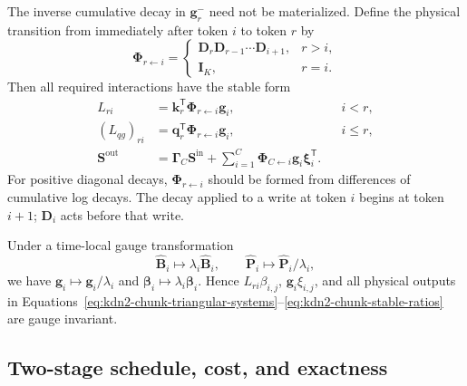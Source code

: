 \documentclass[11pt]{article}
\newcommand{\ve}[1]{\boldsymbol{#1}}
\newcommand{\tr}{\mathsf{T}}
\begin{document}
The inverse cumulative decay in $\ve{g}^{-}_r$ need not be materialized.  Define the physical
transition from immediately after token $i$ to token $r$ by
\begin{equation}
  \ve{\Phi}_{r\leftarrow i}
  =
  \begin{cases}
    \ve{D}_r\ve{D}_{r-1}\cdots\ve{D}_{i+1}, & r>i,\\
    \ve{I}_K, & r=i.
  \end{cases}
  \label{eq:kdn2-chunk-decay-ratio}
\end{equation}
Then all required interactions have the stable form
\begin{equation}
\begin{aligned}
  L_{ri}
  &=\ve{k}_r^{\tr}\ve{\Phi}_{r\leftarrow i}\ve{g}_i,
  && i<r,
  \\
  (L_{qg})_{ri}
  &=\ve{q}_r^{\tr}\ve{\Phi}_{r\leftarrow i}\ve{g}_i,
  && i\le r,
  \\
  \ve{S}^{\mathrm{out}}
  &=\ve{\Gamma}_C\ve{S}^{\mathrm{in}}
    +\sum_{i=1}^{C}
      \ve{\Phi}_{C\leftarrow i}\ve{g}_i\ve{\xi}_i^{\tr}.
\end{aligned}
  \label{eq:kdn2-chunk-stable-ratios}
\end{equation}
For positive diagonal decays, $\ve{\Phi}_{r\leftarrow i}$ should be formed from differences of
cumulative log decays.  The decay applied to a write at token $i$ begins at token $i+1$;
$\ve{D}_i$ acts before that write.

Under a time-local gauge transformation
\begin{equation}
  \widehat{\ve{B}}_i\mapsto\lambda_i\widehat{\ve{B}}_i,
  \qquad
  \widehat{\ve{P}}_i\mapsto\widehat{\ve{P}}_i/\lambda_i,
  \label{eq:kdn2-chunk-local-gauge}
\end{equation}
we have $\ve{g}_i\mapsto\ve{g}_i/\lambda_i$ and
$\ve{\beta}_i\mapsto\lambda_i\ve{\beta}_i$.  Hence
$L_{ri}\beta_{i,j}$, $\ve{g}_i\xi_{i,j}$, and all physical outputs in
Equations~\eqref{eq:kdn2-chunk-triangular-systems}--\eqref{eq:kdn2-chunk-stable-ratios} are gauge
invariant.

\subsection{Two-stage schedule, cost, and exactness}
\label{app:kdn2-chunk-schedule}
\end{document}
